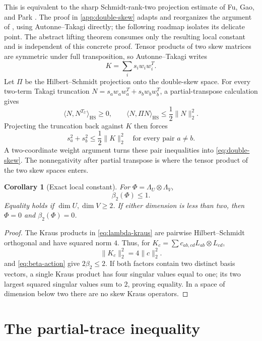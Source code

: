 \documentclass[11pt,reqno]{amsart}
\newtheorem{corollary}[theorem]{Corollary}
\theoremstyle{remark}
\newcommand{\ip}[2]{\langle #1,#2\rangle}
\newcommand{\norm}[1]{\lVert #1\rVert}
\begin{document}
This is equivalent to the sharp Schmidt-rank-two projection estimate of
Fu, Gao, and Park \cite{FuGaoPark2026}.  The proof in
\cref{app:double-skew} adapts and reorganizes the argument of
\cite[\S2]{FuGaoPark2026}, using Autonne--Takagi directly; the following
roadmap isolates its delicate point.
The abstract lifting theorem consumes only the resulting local constant and
is independent of this concrete proof.
Tensor products of two skew matrices are symmetric under full transposition, so
Autonne--Takagi writes
\[
  K=\sum_i s_iw_iw_i^T.
\]
Let $\Pi$ be the Hilbert--Schmidt projection onto the double-skew space.
For every two-term Takagi truncation
$N=s_aw_aw_a^T+s_bw_bw_b^T$, a partial-transpose calculation gives
\[
  \ip N{N^{T_U}}_{\mathrm{HS}}\ge0,
  \qquad
  \ip N{\Pi N}_{\mathrm{HS}}\le\frac12\norm N_2^2.
\]
Projecting the truncation back against $K$ then forces
\[
  s_a^2+s_b^2\le\frac12\norm K_2^2
  \quad\text{for every pair }a\ne b.
\]
A two-coordinate weight argument turns these pair inequalities into
\cref{eq:double-skew}.  The nonnegativity after partial transpose is where
the tensor product of the two skew spaces enters.

\begin{corollary}[Exact local constant]
\label{cor:beta-one}
For $\Phi=\Lambda_U\otimes\Lambda_V$,
\[
  \beta_2(\Phi)\le1.
\]
Equality holds if $\dim U,\dim V\ge2$.  If either dimension is less than two,
then $\Phi=0$ and $\beta_2(\Phi)=0$.
\end{corollary}

\begin{proof}
The Kraus products in \cref{eq:lambda-kraus} are pairwise
Hilbert--Schmidt orthogonal and have squared norm $4$.  Thus, for
$K_c=\sum c_{ab,cd}L_{ab}\otimes L_{cd}$,
\[
  \norm{K_c}_2^2=4\norm c_2^2.
\]
 and \cref{eq:beta-action} give
$2\beta_2\le2$.  If both factors contain two distinct basis vectors, a
single Kraus product has four singular values equal to one; its two largest
squared singular values sum to $2$, proving equality.  In a space of
dimension below two there are no skew Kraus operators.
\end{proof}

\section{The partial-trace inequality}
\label{sec:marginal}
\end{document}
